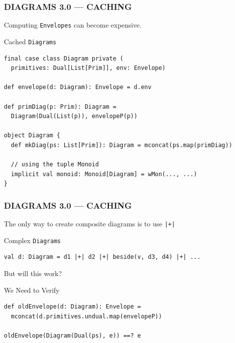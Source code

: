 \documentclass{beamer}
\begin{document}
\begin{frame}[fragile] \frametitle{DIAGRAMS 3.0 --- CACHING}
  Computing \texttt{Envelopes} can become expensive.

  \begin{block}{Cached \texttt{Diagrams}}
  \begin{lstlisting}
final case class Diagram private (
  primitives: Dual[List[Prim]], env: Envelope)

def envelope(d: Diagram): Envelope = d.env

def primDiag(p: Prim): Diagram =
  Diagram(Dual(List(p)), envelopeP(p))

object Diagram {
  def mkDiag(ps: List[Prim]): Diagram = mconcat(ps.map(primDiag))

  // using the tuple Monoid
  implicit val monoid: Monoid[Diagram] = wMon(..., ...)
}
  \end{lstlisting}
  \vspace{-.5cm}
  \end{block}
\end{frame}

\begin{frame}[fragile] \frametitle{DIAGRAMS 3.0 --- CACHING}
  The only way to create composite diagrams is to use \texttt{|+|}

  \begin{block}{Complex \texttt{Diagrams}}
  \begin{lstlisting}
val d: Diagram = d1 |+| d2 |+| beside(v, d3, d4) |+| ...
  \end{lstlisting}
  \end{block}
  But will this work?

  \begin{block}{We Need to Verify}
  \begin{lstlisting}
def oldEnvelope(d: Diagram): Envelope =
  mconcat(d.primitives.undual.map(envelopeP))

oldEnvelope(Diagram(Dual(ps), e)) ==? e
  \end{lstlisting}
  \end{block}
\end{frame}
\end{document}
